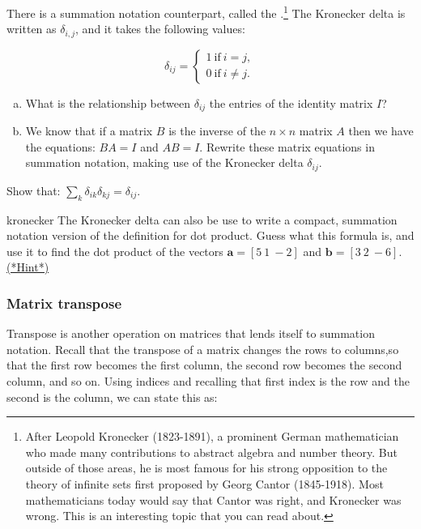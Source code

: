 There is a summation notation counterpart, called the .\footnote{After Leopold Kronecker (1823-1891), a prominent German mathematician who made many contributions to abstract algebra and number theory. But outside of those areas, he is most famous for his strong opposition to the theory of infinite sets first proposed by Georg Cantor (1845-1918).  Most mathematicians today would say that Cantor was right, and Kronecker was wrong. This is an interesting topic that you can read about.} The Kronecker delta is written as $\delta_{i,j}$, and it takes the following values:

\[ \delta_{ij}=
\begin{cases}
1 ~ \text{if} ~ i=j,  \\
0 ~ \text{if} ~ i \neq j.
\end{cases} \]

\begin{exercise}{}
\begin{enumerate}[(a)]
\item
What is the relationship between $\delta_{ij}$ the entries of the identity matrix $I$?
\item
We know that if a matrix $B$ is the inverse of the $n \times n$ matrix $A$ then we have the equations: $BA = I$ and $AB = I$.  Rewrite these matrix equations in summation notation, making use of the Kronecker delta $\delta_{ij}$.
\end{enumerate}
\end{exercise}

\begin{exercise}{}
Show that: $\displaystyle{ \sum_k  \delta_{ik}\delta_{kj}=\delta_{ij}}.$
\end{exercise}

\begin{exercise}{kronecker}
The Kronecker delta can also be use to write a compact, summation notation version of the definition for dot product.  Guess what this formula is, and use it to find the dot product of the vectors $\textbf{a}=[5~1~-2]$ and $\textbf{b}=[3~2~-6]$.
\hyperref[sec:sigma:hints]{(*Hint*)} 
\end{exercise}

\subsubsection*{Matrix transpose}
Transpose is another operation on matrices that lends itself to summation notation.  Recall that the transpose of a matrix changes the rows to columns,so that the first row becomes the first column, the second row becomes the second column, and so on.   Using indices and recalling that first index is the row and the second is the column, we can state this as:

